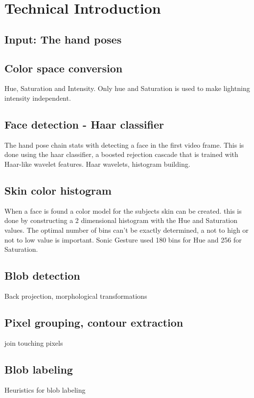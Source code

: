 \chapter{Technical Introduction}
\label{ch:techintro}

\section{Input: The hand poses}

\section{Color space conversion}
Hue, Saturation and Intensity. Only hue and Saturation is used to make lightning intensity independent.

\section{Face detection - Haar classifier}
The hand pose chain stats with detecting a face in the first video frame. This is done using the haar classifier, a  boosted rejection cascade that is trained with Haar-like wavelet features\cite{Lienhart02anextended}.
Haar wavelets, histogram building.

\section{Skin color histogram}
When a face is found a color model for the subjects skin can be created. this is done by constructing a 2 dimensional histogram with the Hue and Saturation values. The optimal number of bins can't be exactly determined, a not to high or not to low value is important. 
Sonic Gesture used 180 bins for Hue and 256 for Saturation. 

\section{Blob detection}
Back projection, morphological transformations

\section{Pixel grouping, contour extraction}
join touching pixels

\section{Blob labeling}
Heuristics for blob labeling

